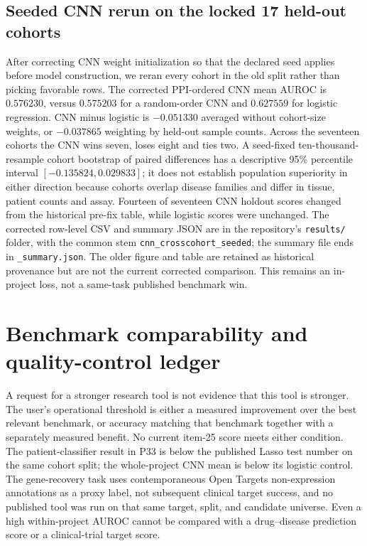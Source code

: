 \documentclass[11pt,a4paper]{article}
\begin{document}
\subsection{Seeded CNN rerun on the locked 17 held-out cohorts}
After correcting CNN weight initialization so that the declared seed applies before model construction, we reran every cohort in the old split rather than picking favorable rows. The corrected PPI-ordered CNN mean AUROC is $0.576230$, versus $0.575203$ for a random-order CNN and $0.627559$ for logistic regression. CNN minus logistic is $-0.051330$ averaged without cohort-size weights, or $-0.037865$ weighting by held-out sample counts. Across the seventeen cohorts the CNN wins seven, loses eight and ties two. A seed-fixed ten-thousand-resample cohort bootstrap of paired differences has a descriptive 95\% percentile interval $[-0.135824,0.029833]$; it does not establish population superiority in either direction because cohorts overlap disease families and differ in tissue, patient counts and assay. Fourteen of seventeen CNN holdout scores changed from the historical pre-fix table, while logistic scores were unchanged. The corrected row-level CSV and summary JSON are in the repository's \texttt{results/} folder, with the common stem \texttt{cnn\_crosscohort\_seeded}; the summary file ends in \texttt{\_summary.json}. The older figure and table are retained as historical provenance but are not the current corrected comparison. This remains an in-project loss, not a same-task published benchmark win.

\section{Benchmark comparability and quality-control ledger}
A request for a stronger research tool is not evidence that this tool is stronger. The user's operational threshold is either a measured improvement over the best relevant benchmark, or accuracy matching that benchmark together with a separately measured benefit. No current item-25 score meets either condition. The patient-classifier result in P33 is below the published Lasso test number on the same cohort split; the whole-project CNN mean is below its logistic control. The gene-recovery task uses contemporaneous Open Targets non-expression annotations as a proxy label, not subsequent clinical target success, and no published tool was run on that same target, split, and candidate universe. Even a high within-project AUROC cannot be compared with a drug--disease prediction score or a clinical-trial target score.
\end{document}
